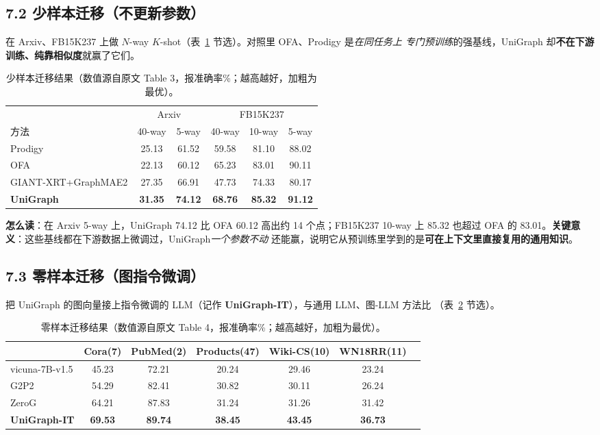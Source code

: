 \documentclass[11pt,UTF8,fontset=fandol]{ctexart}
\begin{document}
\subsection{7.2 少样本迁移（不更新参数）}

在 Arxiv、FB15K237 上做 $N$-way $K$-shot（表~\ref{tab:t3} 节选）。对照里 OFA、Prodigy 是\emph{在同任务上
专门预训练}的强基线，UniGraph 却\textbf{不在下游训练、纯靠相似度}就赢了它们。

\begin{table}[H]\centering
\caption{少样本迁移结果（数值源自原文 Table 3，报准确率\%；越高越好，加粗为最优）。}
\label{tab:t3}
\small
\begin{tabular}{lccccc}
\toprule
 & \multicolumn{2}{c}{Arxiv} & \multicolumn{3}{c}{FB15K237} \\
\cmidrule(lr){2-3}\cmidrule(lr){4-6}
方法 & 40-way & 5-way & 40-way & 10-way & 5-way \\
\midrule
Prodigy        & 25.13 & 61.52 & 59.58 & 81.10 & 88.02 \\
OFA            & 22.13 & 60.12 & 65.23 & 83.01 & 90.11 \\
GIANT-XRT+GraphMAE2 & 27.35 & 66.91 & 47.73 & 74.33 & 80.17 \\
\textbf{UniGraph} & \textbf{31.35} & \textbf{74.12} & \textbf{68.76} & \textbf{85.32} & \textbf{91.12} \\
\bottomrule
\end{tabular}
\end{table}

\textbf{怎么读}：在 Arxiv 5-way 上，UniGraph 74.12 比 OFA 60.12 高出约 14 个点；FB15K237 10-way 上
85.32 也超过 OFA 的 83.01。\textbf{关键意义}：这些基线都在下游数据上微调过，UniGraph\emph{一个参数不动}
还能赢，说明它从预训练里学到的是\textbf{可在上下文里直接复用的通用知识}。

\subsection{7.3 零样本迁移（图指令微调）}

把 UniGraph 的图向量接上指令微调的 LLM（记作 \textbf{UniGraph-IT}），与通用 LLM、图-LLM 方法比
（表~\ref{tab:t4} 节选）。

\begin{table}[H]\centering
\caption{零样本迁移结果（数值源自原文 Table 4，报准确率\%；越高越好，加粗为最优）。}
\label{tab:t4}
\small
\begin{tabular}{lcccccc}
\toprule
 & Cora(7) & PubMed(2) & Products(47) & Wiki-CS(10) & WN18RR(11) \\
\midrule
vicuna-7B-v1.5 & 45.23 & 72.21 & 20.24 & 29.46 & 23.24 \\
G2P2           & 54.29 & 82.41 & 30.82 & 30.11 & 26.24 \\
ZeroG          & 64.21 & 87.83 & 31.24 & 31.26 & 31.42 \\
\textbf{UniGraph-IT} & \textbf{69.53} & \textbf{89.74} & \textbf{38.45} & \textbf{43.45} & \textbf{36.73} \\
\bottomrule
\end{tabular}
\end{table}
\end{document}
